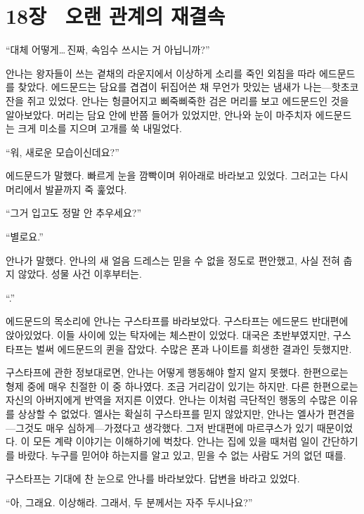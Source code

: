 

\chapter[18장  오랜 관계의 재결속][18장\hspace*{.5em}오랜 관계의 재결속]{18장 \ 오랜 관계의 재결속}



\forceindent``대체 어떻게\ldots\,진짜, 속임수 쓰시는 거 아닙니까?''

안나는 왕자들이 쓰는 곁채의 라운지에서 이상하게 소리를 죽인 외침을 따라 에드문드를 찾았다. 에드문드는 담요를 겹겹이 뒤집어쓴 채 무언가 맛있는 냄새가 나는—핫초코 잔을 쥐고 있었다. 안나는 헝클어지고 삐죽삐죽한 검은 머리를 보고 에드문드인 것을 알아보았다. 머리는 담요 안에 반쯤 들어가 있었지만, 안나와 눈이 마주치자 에드문드는 크게 미소를 지으며 고개를 쑥 내밀었다.

``워, 새로운 모습이신데요?''

에드문드가 말했다. 빠르게 눈을 깜빡이며 위아래로 바라보고 있었다. 그러고는 다시 머리에서 발끝까지 죽 훑었다.

``그거 입고도 정말 안 추우세요?''

``별로요.''

안나가 말했다. 안나의 새 얼음 드레스는 믿을 수 없을 정도로 편안했고, 사실 전혀 춥지 않았다. 성물 사건 이후부터는.

``.''

에드문드의 목소리에 안나는 구스타프를 바라보았다. 구스타프는 에드문드 반대편에 앉아있었다. 이들 사이에 있는 탁자에는 체스판이 있었다. 대국은 초반부였지만, 구스타프는 벌써 에드문드의 퀸을 잡았다. 수많은 폰과 나이트를 희생한 결과인 듯했지만.

구스타프에 관한 정보대로면, 안나는 어떻게 행동해야 할지 알지 못했다. 한편으로는 형제 중에 매우 친절한 이 중 하나였다. 조금 거리감이 있기는 하지만. 다른 한편으로는 자신의 아버지에게 반역을 저지른 이였다. 안나는 이처럼 극단적인 행동의 수많은 이유를 상상할 수 없었다. 엘사는 확실히 구스타프를 믿지 않았지만, 안나는 엘사가 편견을—그것도 매우 심하게—가졌다고 생각했다. 그저 반대편에 마르쿠스가 있기 때문이었다. 이 모든 계략 이야기는 이해하기에 벅찼다. 안나는 집에 있을 때처럼 일이 간단하기를 바랐다. 누구를 믿어야 하는지를 알고 있고, 믿을 수 없는 사람도 거의 없던 때를.

구스타프는 기대에 찬 눈으로 안나를 바라보았다. 답변을 바라고 있었다.

``아, 그래요. 이상해라. 그래서, 두 분께서는 자주 두시나요?''

